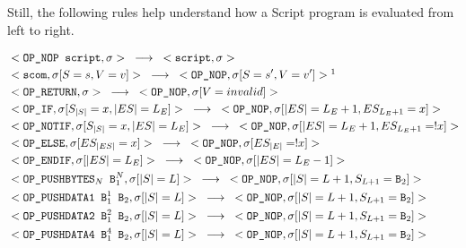 \documentclass{article}
\begin{document}
Still, the following rules help understand how a Script program is evaluated from left to right.

\begin{align*}
&<\texttt{OP\_NOP script}, \sigma> \hspace{3mm}
	\longrightarrow \hspace{3mm}
	<\texttt{script}, \sigma> \\
&<\texttt{scom}, \sigma[S=s, V=v]> \hspace{3mm}
	\longrightarrow \hspace{3mm}
	<\texttt{OP\_NOP}, \sigma[S=s', V=v']>\footnotemark \\
&<\texttt{OP\_RETURN}, \sigma> \hspace{3mm}
	\longrightarrow \hspace{3mm}
	<\texttt{OP\_NOP}, \sigma[V = invalid]> \\
&<\texttt{OP\_IF}, \sigma[S_{|S|}=x, |ES|=L_E]> \hspace{3mm}
	\longrightarrow \hspace{3mm}
	<\texttt{OP\_NOP}, \sigma[|ES|=L_{E}+1, ES_{L_E+1}=x]>\\
&<\texttt{OP\_NOTIF}, \sigma[S_{|S|}=x, |ES|=L_E]> \hspace{3mm}
	\longrightarrow \hspace{3mm}
	<\texttt{OP\_NOP}, \sigma[|ES|=L_{E}+1, ES_{L_E+1}=!x]>\\
&<\texttt{OP\_ELSE}, \sigma[ES_{|ES|}=x]> \hspace{3mm}
	\longrightarrow \hspace{3mm}
	<\texttt{OP\_NOP}, \sigma[ES_{|E|}=!x]>\\	
&<\texttt{OP\_ENDIF}, \sigma[|ES|=L_E]> \hspace{3mm}
	\longrightarrow \hspace{3mm}
	<\texttt{OP\_NOP}, \sigma[|ES|=L_{E}-1]>\\
&<\texttt{OP\_PUSHBYTES$_N$ B$_1^N$}, \sigma[|S|=L]> \hspace{3mm}
	\longrightarrow \hspace{3mm}
	<\texttt{OP\_NOP}, \sigma[|S|=L+1, S_{L+1}=\texttt{B}_2]>\\
&<\texttt{OP\_PUSHDATA1 B$_1^1$ B$_2$}, \sigma[|S|=L]> \hspace{3mm}
	\longrightarrow \hspace{3mm}
	<\texttt{OP\_NOP}, \sigma[|S|=L+1, S_{L+1}=\texttt{B}_2]>\\
&<\texttt{OP\_PUSHDATA2 B$_1^2$ B$_2$}, \sigma[|S|=L]> \hspace{3mm}
	\longrightarrow \hspace{3mm}
	<\texttt{OP\_NOP}, \sigma[|S|=L+1, S_{L+1}=\texttt{B}_2]>\\
&<\texttt{OP\_PUSHDATA4 B$_1^4$ B$_2$}, \sigma[|S|=L]> \hspace{3mm}
	\longrightarrow \hspace{3mm}
	<\texttt{OP\_NOP}, \sigma[|S|=L+1, S_{L+1}=\texttt{B}_2]>\\
\end{align*}
\end{document}
